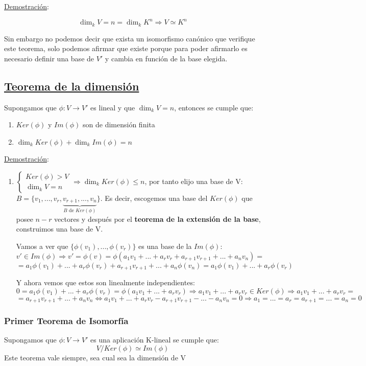 \documentclass[10pt,a4paper,openright]{book}
\begin{document}
\underline{Demostración}:\par
$$\dim_k V=n=\dim_k K^n\Rightarrow V\simeq K^n$$

Sin embargo no podemos decir que exista un isomorfismo canónico que verifique este teorema, solo podemos afirmar que existe porque para poder afirmarlo es necesario definir una base de $V'$ y cambia en función de la base elegida.

\subsection*{\underline{Teorema de la dimensión}}
Supongamos que $\phi: V\longrightarrow V'$ es lineal y que $\dim_k V=n$, entonces se cumple que:
\begin{enumerate}
\item $Ker(\phi)$ y $Im(\phi)$ son de dimensión finita
\item $\dim_k Ker(\phi)+\dim_k Im(\phi)=n$
\end{enumerate}

\underline{Demostración}:
\begin{enumerate}
\item $\begin{cases} Ker(\phi)>V\\ \dim_k V=n\end{cases}\Rightarrow \dim_k Ker(\phi)\leq n$, por tanto elijo una base de V: $B=\{v_1,..., v_r, \underbrace{v_{r+1}, ..., v_n}_{B\mbox{ de }Ker(\phi)}\}$. Es decir, escogemos una base del $Ker(\phi)$ que posee $n-r$ vectores y después por el \textbf{teorema de la extensión de la base}, construimos una base de V.\par

Vamos a ver que $\{\phi(v_1), ..., \phi(v_r)\}$ es una base de la $Im(\phi)$:
$$v'\in Im(\phi)\Rightarrow v'=\phi(v)=\phi(a_1v_1+...+a_rv_r+a_{r+1}v_{r+1}+...+a_nv_n)=$$
$$=a_1\phi(v_1)+...+a_r\phi(v_r)+a_{r+1}v_{r+1}+...+a_n\phi(v_n)=a_1\phi(v_1)+...+a_r\phi(v_r)$$

Y ahora vemos que estos son linealmente independientes:
$$0=a_1\phi(v_1)+...+a_r\phi(v_r)=\phi(a_1v_1+...+a_rv_r)\Rightarrow a_1v_1+...+a_rv_r\in Ker(\phi)\Rightarrow a_1v_1+...+a_rv_r=$$
$$=a_{r+1}v_{r+1}+...+a_nv_n\Leftrightarrow a_1v_1+...+a_rv_r-a_{r+1}v_{r+1}-...-a_nv_n=0\Rightarrow a_1=...=a_r=a_{r+1}=...=a_n=0$$
\end{enumerate}

\subsubsection*{Primer Teorema de Isomorfía}
Supongamos que $\phi: V\longrightarrow V'$ es una aplicación K-lineal se cumple que:
$$V/Ker(\phi)\simeq Im(\phi)$$
Este teorema vale siempre, sea cual sea la dimensión de V
\end{document}
